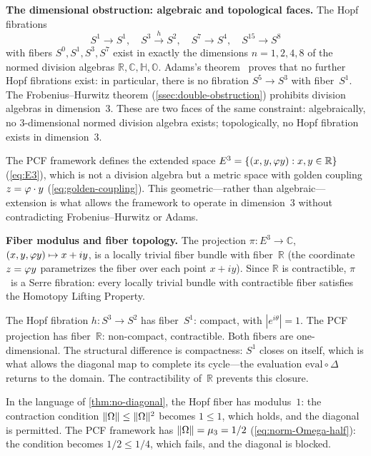 \smallskip\noindent\textbf{The dimensional obstruction: algebraic and topological
faces.}
The Hopf fibrations~\cite{hopf31}
\[
  S^1\to S^1,\quad
  S^3\xrightarrow{h} S^2,\quad
  S^7\to S^4,\quad
  S^{15}\to S^8
\]
with fibers $S^0, S^1, S^3, S^7$ exist in exactly the dimensions
$n=1,2,4,8$ of the normed division algebras
$\mathbb{R},\mathbb{C},\mathbb{H},\mathbb{O}$.  Adams's
theorem~\cite{adams60} proves that no further Hopf fibrations exist:
in particular, there is no fibration $S^5\to S^3$ with fiber~$S^1$.
The Frobenius--Hurwitz theorem (\cref{ssec:double-obstruction})
prohibits division algebras in dimension~$3$.  These are two faces of
the same constraint: algebraically, no $3$-dimensional normed division
algebra exists; topologically, no Hopf fibration exists in
dimension~$3$.

The PCF framework defines the extended space
$E^3 = \{(x,y,\varphi y): x,y\in\mathbb{R}\}$
(\cref{eq:E3}), which is not a division algebra but a metric space
with golden coupling $z=\varphi\cdot y$
(\cref{eq:golden-coupling}).  This geometric---rather than
algebraic---extension is what allows the framework to operate in
dimension~$3$ without contradicting Frobenius--Hurwitz or Adams.


\smallskip\noindent\textbf{Fiber modulus and fiber topology.}
The projection $\pi\colon E^3\to\mathbb{C}$,
$(x,y,\varphi y)\mapsto x+iy$, is a locally trivial fiber bundle with
fiber~$\mathbb{R}$ (the coordinate $z=\varphi y$ parametrizes the fiber
over each point $x+iy$).  Since $\mathbb{R}$ is contractible, $\pi$~is
a Serre fibration: every locally trivial bundle with contractible fiber
satisfies the Homotopy Lifting Property.

The Hopf fibration $h\colon S^3\to S^2$ has fiber~$S^1$: compact,
with $|e^{i\theta}|=1$.  The PCF projection has fiber~$\mathbb{R}$:
non-compact, contractible.  Both fibers are one-dimensional.  The
structural difference is compactness: $S^1$ closes on itself, which is
what allows the diagonal map to complete its cycle---the evaluation
$\mathrm{eval}\circ\Delta$ returns to the domain.  The contractibility
of~$\mathbb{R}$ prevents this closure.

In the language of \cref{thm:no-diagonal}, the Hopf fiber has
modulus~$1$: the contraction condition $\|\Omega\|\le\|\Omega\|^2$
becomes $1\le 1$, which holds, and the diagonal is permitted.  The PCF
framework has $\|\Omega\|=\mu_3=1/2$
(\cref{eq:norm-Omega-half}): the condition becomes $1/2\le 1/4$,
which fails, and the diagonal is blocked.

